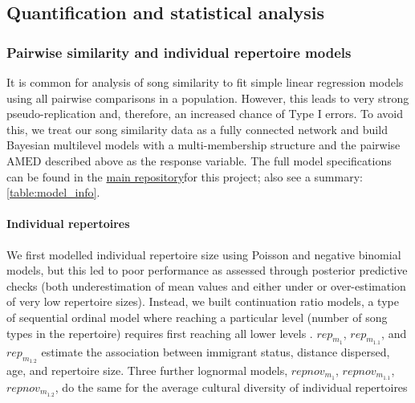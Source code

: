 \subsection{Quantification and statistical analysis}

\subsubsection{Pairwise similarity and individual repertoire models}

It is common for analysis of song similarity to fit simple linear regression models using all pairwise comparisons in a population. However, this leads to very strong pseudo-replication and, therefore, an increased chance of Type I errors. To avoid this, we treat our song similarity data as a fully connected network and build Bayesian multilevel models with a multi-membership structure and the pairwise $\text{AMED}$ described above as the response variable. The full model specifications can be found in the \href{https://github.com/nilomr/birdsong-demography}{main repository}for this project; also see a summary: \autoref{table:model_info}.

\paragraph{Individual repertoires}
We first modelled individual repertoire size using Poisson and negative binomial models, but this led to poor performance as assessed through posterior predictive checks (both underestimation of mean values and either under or over-estimation of very low repertoire sizes). Instead, we built continuation ratio models, a type of sequential ordinal model where reaching a particular level (number of song types in the repertoire) requires first reaching all lower levels \parencite{chambers2023, warti2020}. $rep_{m_1}$, $rep_{m_{1.1}}$, and $rep_{m_{1.2}}$ estimate the association between immigrant status, distance dispersed, age, and repertoire size. Three further lognormal models, $repnov_{m_1}$, $repnov_{m_{1.1}}$, $repnov_{m_{1.2}}$, do the same for the average cultural diversity of individual repertoires

